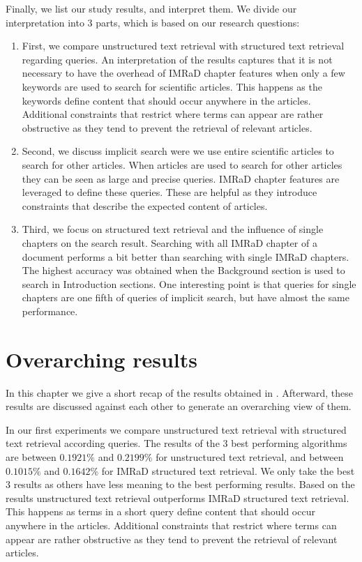 Finally, we list our study results, and interpret them. We divide our interpretation into $3$ parts, which is based on our research questions:
\begin{enumerate}[label=(\alph*)]
  \item First, we compare unstructured text retrieval with structured text retrieval regarding queries. An interpretation of the results captures that it is not necessary to have the overhead of IMRaD chapter features when only a few keywords are used to search for scientific articles. This happens as the keywords define content that should occur anywhere in the articles. Additional constraints that restrict where terms can appear are rather obstructive as they tend to prevent the retrieval of relevant articles.
  \item Second, we discuss implicit search were we use entire scientific articles to search for other articles. When articles are used to search for other articles they can be seen as large and precise queries. IMRaD chapter features are leveraged to define these queries. These are helpful as they introduce constraints that describe the expected content of articles.
  \item Third, we focus on structured text retrieval and the influence of single chapters on the search result. Searching with all IMRaD chapter of a document performs a bit better than searching with single IMRaD chapters. The highest accuracy was obtained when the Background section is used to search in Introduction sections. One interesting point is that queries for single chapters are one fifth of queries of implicit search, but have almost the same performance.
\end{enumerate}

\section{Overarching results}
\label{sec:overarching_results}

In this chapter we give a short recap of the results obtained in . Afterward, these results are discussed against each other to generate an overarching view of them.

In our first experiments we compare unstructured text retrieval with structured text retrieval according queries. The results of the $3$ best performing algorithms are between $0.1921\%$ and $0.2199\%$ for unstructured text retrieval, and between $0.1015\%$ and $0.1642\%$ for IMRaD structured text retrieval. We only take the best $3$ results as others have less meaning to the best performing results. Based on the results unstructured text retrieval outperforms IMRaD structured text retrieval. This happens as terms in a short query define content that should occur anywhere in the articles. Additional constraints that restrict where terms can appear are rather obstructive as they tend to prevent the retrieval of relevant articles.

